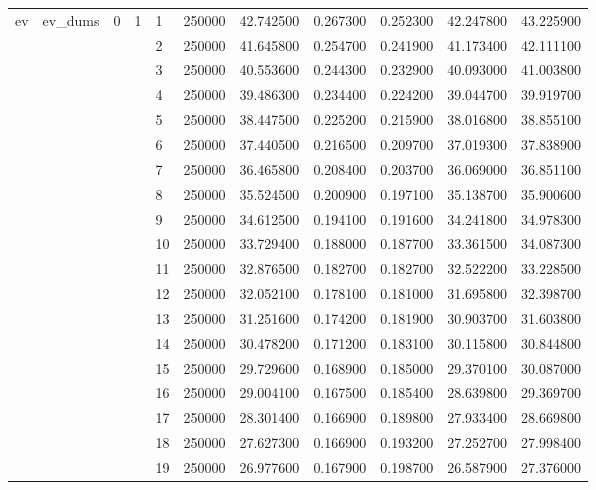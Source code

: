 \begin{tabular}{llllllrrrrr}
\multirow[t]{202}{*}{ev} & \multirow[t]{202}{*}{ev_dums} & \multirow[t]{101}{*}{0} & \multirow[t]{25}{*}{1} & 1 & 250000 & 42.742500 & 0.267300 & 0.252300 & 42.247800 & 43.225900 \\
\cline{5-11}
 &  &  &  & 2 & 250000 & 41.645800 & 0.254700 & 0.241900 & 41.173400 & 42.111100 \\
\cline{5-11}
 &  &  &  & 3 & 250000 & 40.553600 & 0.244300 & 0.232900 & 40.093000 & 41.003800 \\
\cline{5-11}
 &  &  &  & 4 & 250000 & 39.486300 & 0.234400 & 0.224200 & 39.044700 & 39.919700 \\
\cline{5-11}
 &  &  &  & 5 & 250000 & 38.447500 & 0.225200 & 0.215900 & 38.016800 & 38.855100 \\
\cline{5-11}
 &  &  &  & 6 & 250000 & 37.440500 & 0.216500 & 0.209700 & 37.019300 & 37.838900 \\
\cline{5-11}
 &  &  &  & 7 & 250000 & 36.465800 & 0.208400 & 0.203700 & 36.069000 & 36.851100 \\
\cline{5-11}
 &  &  &  & 8 & 250000 & 35.524500 & 0.200900 & 0.197100 & 35.138700 & 35.900600 \\
\cline{5-11}
 &  &  &  & 9 & 250000 & 34.612500 & 0.194100 & 0.191600 & 34.241800 & 34.978300 \\
\cline{5-11}
 &  &  &  & 10 & 250000 & 33.729400 & 0.188000 & 0.187700 & 33.361500 & 34.087300 \\
\cline{5-11}
 &  &  &  & 11 & 250000 & 32.876500 & 0.182700 & 0.182700 & 32.522200 & 33.228500 \\
\cline{5-11}
 &  &  &  & 12 & 250000 & 32.052100 & 0.178100 & 0.181000 & 31.695800 & 32.398700 \\
\cline{5-11}
 &  &  &  & 13 & 250000 & 31.251600 & 0.174200 & 0.181900 & 30.903700 & 31.603800 \\
\cline{5-11}
 &  &  &  & 14 & 250000 & 30.478200 & 0.171200 & 0.183100 & 30.115800 & 30.844800 \\
\cline{5-11}
 &  &  &  & 15 & 250000 & 29.729600 & 0.168900 & 0.185000 & 29.370100 & 30.087000 \\
\cline{5-11}
 &  &  &  & 16 & 250000 & 29.004100 & 0.167500 & 0.185400 & 28.639800 & 29.369700 \\
\cline{5-11}
 &  &  &  & 17 & 250000 & 28.301400 & 0.166900 & 0.189800 & 27.933400 & 28.669800 \\
\cline{5-11}
 &  &  &  & 18 & 250000 & 27.627300 & 0.166900 & 0.193200 & 27.252700 & 27.998400 \\
\cline{5-11}
 &  &  &  & 19 & 250000 & 26.977600 & 0.167900 & 0.198700 & 26.587900 & 27.376000 \\

\end{tabular}
